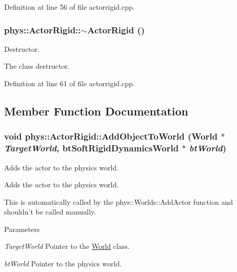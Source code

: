 Definition at line 56 of file actorrigid.cpp.

\hypertarget{classphys_1_1ActorRigid_ab317b5a2578157e54655a1aea8f4d058}{
\subsubsection[{$\sim$ActorRigid}]{\setlength{\rightskip}{0pt plus 5cm}phys::ActorRigid::$\sim$ActorRigid ()}}
\label{d8/d71/classphys_1_1ActorRigid_ab317b5a2578157e54655a1aea8f4d058}


Destructor. 

The class destructor. 

Definition at line 61 of file actorrigid.cpp.



\subsection{Member Function Documentation}
\hypertarget{classphys_1_1ActorRigid_a3c56eb06fe6a7d468b7a67c45ade7be4}{
\subsubsection[{AddObjectToWorld}]{\setlength{\rightskip}{0pt plus 5cm}void phys::ActorRigid::AddObjectToWorld ({\bf World} $\ast$ {\em TargetWorld}, \/  btSoftRigidDynamicsWorld $\ast$ {\em btWorld})}}
\label{d8/d71/classphys_1_1ActorRigid_a3c56eb06fe6a7d468b7a67c45ade7be4}


Adds the actor to the physics world. 

Adds the actor to the physics world. \par
 This is automatically called by the phys::Worlds::AddActor function and shouldn't be called manually. 
\begin{DoxyParams}{Parameters}
\item[{\em TargetWorld}]Pointer to the \hyperlink{classphys_1_1World}{World} class. \item[{\em btWorld}]Pointer to the physics world. \end{DoxyParams}


